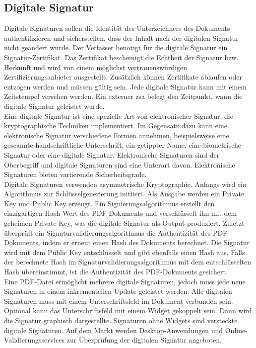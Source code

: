 \subsection{Digitale Signatur}
Digitale Signaturen sollen die Identität des Unterzeichners des Dokuments authentifizieren und sicherstellen, dass der Inhalt nach der digitalen Signatur nicht geändert wurde. Der Verfasser benötigt für die digitale Signatur ein Signatur-Zertifikat. Das Zertifikat bescheinigt die Echtheit der Signatur bzw. Herkunft und wird von einem möglichst vertrauenswürdigen Zertifizierungsanbieter ausgestellt. Zusätzlich können Zertifikate ablaufen oder entzogen werden und müssen gültig sein. Jede digitale Signatur kann mit einem Zeitstempel versehen werden. Ein externer \gls{zsa} belegt den Zeitpunkt, wann die digitale Signatur geleistet wurde. \cite{softx} \\
Eine digitale Signatur ist eine spezielle Art von elektronischer Signatur, die kryptographische Techniken implementiert. Im Gegensatz dazu kann eine elektronische Signatur verschiedene Formen annehmen, beispielsweise eine gescannte handschriftliche Unterschrift, ein getippter Name, eine biometrische Signatur oder eine digitale Signatur. Elektronische Signaturen sind der Oberbegriff und digitale Signaturen sind eine Unterart davon. Elektronische Signaturen bieten variierende Sicherheitsgrade. \cite{adobe-pdf-pades} \\
Digitale Signaturen verwenden asymmetrische Kryptographie. Anfangs wird ein Algorithmus zur Schlüsselgenerierung initiiert. Als Ausgabe werden ein Private Key und Public Key erzeugt. Ein Signierungsalgorithmus erstellt den einzigartigen Hash-Wert des PDF-Dokuments und verschlüsselt ihn mit dem geheimen Private Key, was die digitale Signatur als Output produziert. Zuletzt überprüft ein Signaturvalidierungsalgorithmus die Authentizität des PDF-Dokuments, indem er erneut einen Hash des Dokuments berechnet. Die Signatur wird mit dem Public Key entschlüsselt und gibt ebenfalls einen Hash aus. Falls der berechnete Hash im Signaturvalidierungsalgorithmus mit dem entschlüsselten Hash übereinstimmt, ist die Authentizität des PDF-Dokuments gesichert. \cite{signature} \\
Eine PDF-Datei ermöglicht mehrere digitale Signaturen, jedoch muss jede neue Signaturen in einem inkrementellen Update geleistet werden. Alle digitalen Signaturen muss mit einem Unterschriftsfeld im Dokument verbunden sein. Optional kann das Unterschriftsfeld mit einem Widget gekoppelt sein. Dann wird die Signatur graphisch dargestellte. Signaturen ohne Widgets sind versteckte digitale Signaturen. \cite{softx} Auf dem Markt werden Desktop-Anwendungen und Online-Validierungsservices zur Überprüfung der digitalen Signatur angeboten.




